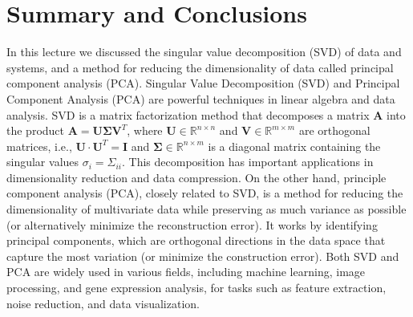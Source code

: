 \documentclass{article}[11pt]
\begin{document}
\section{Summary and Conclusions}
In this lecture we discussed the singular value decomposition (SVD) of data and systems, and a method for reducing the dimensionality of data called principal component analysis (PCA).
Singular Value Decomposition (SVD) and Principal Component Analysis (PCA) are powerful techniques in linear algebra and data analysis. 
SVD is a matrix factorization method that decomposes a matrix $\mathbf{A}$ into the product $\mathbf{A} = \mathbf{U}\mathbf{\Sigma}\mathbf{V}^{T}$, where
$\mathbf{U}\in\mathbb{R}^{n\times{n}}$ and $\mathbf{V}\in\mathbb{R}^{m\times{m}}$ are orthogonal matrices, i.e., $\mathbf{U}\cdot\mathbf{U}^{T} = \mathbf{I}$ and $\mathbf{\Sigma}\in\mathbb{R}^{n\times{m}}$ 
is a diagonal matrix containing the singular values $\sigma_{i}=\Sigma_{ii}$.
This decomposition has important applications in dimensionality reduction and data compression. 
On the other hand, principle component analysis (PCA), closely related to SVD, 
is a method for reducing the dimensionality of multivariate data while preserving as much variance as possible (or alternatively minimize the reconstruction error). 
It works by identifying principal components, which are orthogonal directions in the data space that capture the most variation (or minimize the construction error). 
Both SVD and PCA are widely used in various fields, including machine learning, image processing, and gene expression analysis, 
for tasks such as feature extraction, noise reduction, and data visualization.


\end{document}
